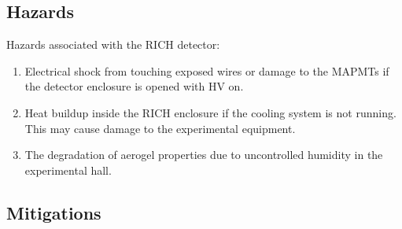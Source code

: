 \subsection{Hazards} 

Hazards associated with the RICH detector:
\begin{enumerate}
\item  Electrical shock from touching exposed wires or damage to the MAPMTs if the detector enclosure 
is opened with HV on.
\item Heat buildup inside the RICH enclosure if the cooling system is not running. This may cause 
damage to the experimental equipment.
\item The degradation of aerogel properties due to uncontrolled humidity in the experimental hall.
\end{enumerate}

\subsection{Mitigations}

